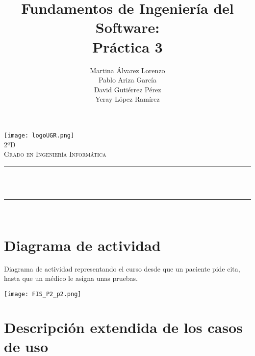 \documentclass[12pt, spanish]{article}
\title{Fundamentos de Ingeniería del Software:\\
Práctica 3  \hspace{0.05cm} }
\date{}
\author{
\begin{center}
Martina Álvarez Lorenzo  \\
Pablo Ariza García  \\
David Gutiérrez Pérez  \\
Yeray López Ramírez \\
\end{center}
}
\makeatletter
\let\thetitle\@title
\let\theauthor\@author
\makeatother
\begin{document}

\begin{titlepage}
  \centering
  \vspace*{0.5 cm}
  \texttt{[image: logoUGR.png]}\\[1.0 cm]
  \textsc{\large 2ºD}\\[0.5 cm]
  \textsc{\large Grado en Ingeniería Informática}\\[0.5 cm]              
  \rule{\linewidth}{0.2 mm} \\[0.4 cm]
  { \huge \bfseries \thetitle}\\
  \rule{\linewidth}{0.2 mm} \\[1.5 cm]
  
      
  \theauthor

  \vfill
  
\end{titlepage}

\newpage



\tableofcontents
\pagebreak

\section{Diagrama de actividad}
Diagrama de actividad representando el curso desde que un paciente pide cita, hasta que un médico le asigna unas pruebas.\\

\begin{centering}\texttt{[image: FIS\_P2\_p2.png]}\\[1.0 cm]\end{centering}


\section{Descripción extendida de los casos de uso}
\end{document}
